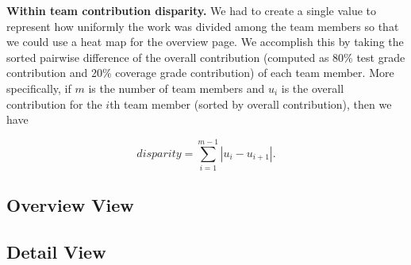 \documentclass[../manifest.tex]{subfiles}
\begin{document}
\textbf{Within team contribution disparity.} We had to create a single value to represent how uniformly the work was divided among the team members so that we could use a heat map for the overview page. We accomplish this by taking the sorted pairwise difference of the overall contribution (computed as 80\% test grade contribution and 20\% coverage grade contribution) of each team member. More specifically, if $m$ is the number of team members and $u_i$ is the overall contribution for the $i$th team member (sorted by overall contribution), then we have

\begin{equation}
  \label{eq:disparity}
  disparity = \sum_{i=1}^{m-1} |u_i - u_{i+1}|.
\end{equation}



\subsection{Overview View}
\subsection{Detail View}
\end{document}
